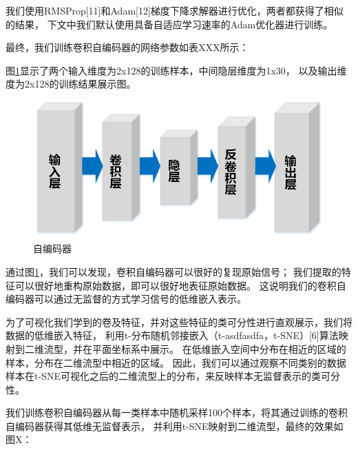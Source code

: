 我们使用RMSProp[11]和Adam[12]梯度下降求解器进行优化，两者都获得了相似的结果，
下文中我们默认使用具备自适应学习速率的Adam优化器进行训练。\par

最终，我们训练卷积自编码器的网络参数如表XXX所示：

图\ref{sec:fig_3_4}显示了两个输入维度为2x128的训练样本，中间隐层维度为1x30，
以及输出维度为2x128的训练结果展示图。\par
\begin{figure}[!h]
	\centering
	\includegraphics[scale=0.2]{figures/chapter_3/fig_3_3}
	\caption{自编码器}	\label{sec:fig_3_4}
\end{figure} 

通过图\ref{sec:fig_3_4}，我们可以发现，卷积自编码器可以很好的复现原始信号；
我们提取的特征可以很好地重构原始数据，即可以很好地表征原始数据。
这说明我们的卷积自编码器可以通过无监督的方式学习信号的低维嵌入表示。\par

为了可视化我们学到的卷及特征，并对这些特征的类可分性进行直观展示，我们将数据的低维嵌入特征，
利用t-分布随机邻接嵌入（t-asdfasdfa，t-SNE）[6]算法映射到二维流型，并在平面坐标系中展示。
在低维嵌入空间中分布在相近的区域的样本，分布在二维流型中相近的区域。
因此，我们可以通过观察不同类别的数据样本在t-SNE可视化之后的二维流型上的分布，来反映样本无监督表示的类可分性。\par

我们训练卷积自编码器从每一类样本中随机采样100个样本，将其通过训练的卷积自编码器获得其低维无监督表示，
并利用t-SNE映射到二维流型，最终的效果如图X：\par


